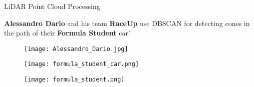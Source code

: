 \documentclass[aspectratio=169]{beamer}
\begin{document}
\begin{frame}{LiDAR Point Cloud Processing}


\begin{minipage}[c]{0.8\textwidth}
    \textbf{Alessandro Dario} and his team \textbf{RaceUp} use DBSCAN for detecting cones in the path of their \textbf{Formula Student} car!
\end{minipage}
\begin{minipage}[c]{0.17\textwidth}
    \begin{figure}
        \centering
        \texttt{[image: Alessandro\_Dario.jpg]}
    \end{figure}
\end{minipage}

\vspace{0.3cm}

\begin{minipage}[c]{0.4\textwidth}
    \begin{figure}
        \centering
        \texttt{[image: formula\_student\_car.png]}
    \end{figure}
\end{minipage}
\hfill 
\begin{minipage}[c]{0.55\textwidth}

\begin{figure}
    \centering
    \texttt{[image: formula\_student.png]}
\end{figure}
\end{minipage}
\end{frame}


\begin{comment}
\begin{frame}{The Future of DBSCAN}
    DBSCAN still remains an \textbf{active research field} to this day and only awaits for passionate researchers to develop further.

    \begin{figure}
        \centering
        \texttt{[image: 38-381783\_want-you-for-us-army-transparent-hd-png-4253689009.png]}
    \end{figure}
\end{frame}
\end{comment}
\end{document}
